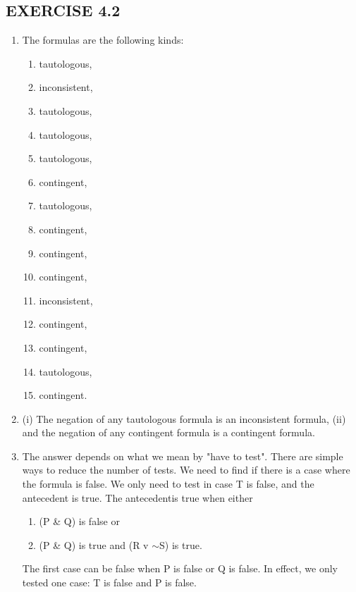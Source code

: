 \documentclass[a4paper,12pt]{article}
\newcommand{\s}{$\sim$}
\begin{document}
    \newpage

    \subsection*{EXERCISE 4.2}

    \begin{enumerate}[label=\arabic*,leftmargin=*]

        \item The formulas are the following kinds:
            \begin{enumerate}[label=\arabic*,leftmargin=*]
                \item tautologous,
                \item inconsistent,
                \item tautologous,
                \item tautologous,
                \item tautologous,
                \item contingent,

                \item tautologous,
                \item contingent,
                \item contingent,
                \item contingent,
                \item inconsistent,

                \item contingent,
                \item contingent,
                \item tautologous,

                \item contingent.
        \end{enumerate}

        \item (i) The negation of any tautologous formula is an inconsistent formula, (ii) and the negation of any contingent formula is a contingent formula.

        \item The answer depends on what we mean by "have to test". There are simple ways to reduce the number of tests. We need to find if there is a case where the formula is false. We only need to test in case T is false, and the antecedent is true. The antecedentis true when either
            \begin{enumerate}[label=\arabic*,leftmargin=*]
                \item (P \& Q) is false or
                \item (P \& Q) is true and (R v \s S) is true.
            \end{enumerate}
            The first case can be false when P is false or Q is false. In effect, we only tested one case: T is false and P is false.

    \end{enumerate}
\end{document}
